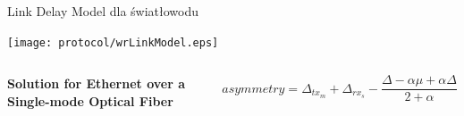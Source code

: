 \documentclass[compress,red]{beamer}
\begin{document}
\begin{frame}{Link Delay Model dla światłowodu}

  \begin{center}
  \texttt{[image: protocol/wrLinkModel.eps]}
  \end{center}

  \begin{columns}[c]
  \column{1.5in}

    \begin{center}
      \textbf{Solution for Ethernet over a Single-mode Optical Fiber}
    \end{center}    

  \column{2.7in}

    \begin{equation}
      \nonumber asymmetry = \Delta_{tx_m} + \Delta_{rx_s} - \frac{\Delta - \alpha \mu + \alpha \Delta}{2 + \alpha}
    \end{equation}

  \end{columns}

\end{frame}
% 
% 
\end{document}
